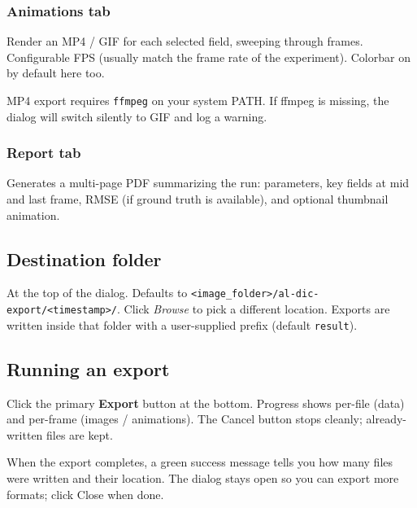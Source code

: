 \subsubsection*{Animations tab}

Render an MP4 / GIF for each selected field, sweeping through
frames. Configurable FPS (usually match the frame rate of the
experiment). Colorbar on by default here too.

\begin{warnbox}
MP4 export requires \texttt{ffmpeg} on your system PATH. If ffmpeg is
missing, the dialog will switch silently to GIF and log a warning.
\end{warnbox}

\subsubsection*{Report tab}

Generates a multi-page PDF summarizing the run: parameters, key
fields at mid and last frame, RMSE (if ground truth is available),
and optional thumbnail animation.

\subsection{Destination folder}

At the top of the dialog. Defaults to
\texttt{<image\_folder>/al-dic-export/<timestamp>/}. Click
\emph{Browse} to pick a different location. Exports are written
inside that folder with a user-supplied prefix (default
\texttt{result}).

\subsection{Running an export}

Click the primary \textbf{Export} button at the bottom. Progress
shows per-file (data) and per-frame (images / animations). The
Cancel button stops cleanly; already-written files are kept.

When the export completes, a green success message tells you how
many files were written and their location. The dialog stays open
so you can export more formats; click Close when done.
